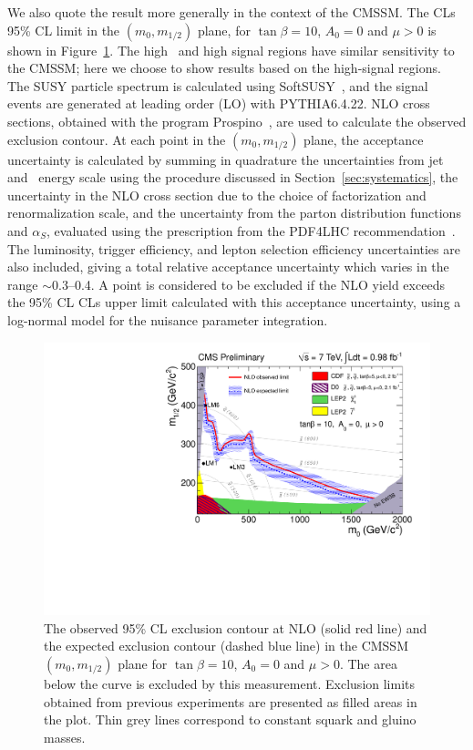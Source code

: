 We also quote the result more generally in the context of the CMSSM.
The CLs 95\% CL limit  in the  $(m_0,m_{1/2})$ plane,  for $\tan\beta=10$,
$A_0 = 0$ and $\mu > 0$ is shown in Figure~\ref{fig:msugra}. 
The high \met\ and high \Ht signal regions have similar sensitivity to the CMSSM; 
here we choose to show results based on the high-\Ht signal regions. The
SUSY particle  spectrum is calculated using  SoftSUSY~\cite{Allanach:2002uq}, and the
signal  events  are  generated  at  leading  order  (LO)  with  PYTHIA6.4.22.
NLO  cross sections,  obtained  with the
program  Prospino~\cite{Beenakker:1997kx},  are used  to  calculate  the observed
exclusion  contour.  
At each point in the  $(m_0,m_{1/2})$ plane, the acceptance uncertainty is calculated by
summing in quadrature the uncertainties from jet and \met\ energy scale using the
procedure discussed in Section~\ref{sec:systematics}, the uncertainty in the 
NLO cross section due to the choice of factorization and renormalization scale, 
and the uncertainty from the parton distribution functions and $\alpha_{S}$,
evaluated using the prescription from the PDF4LHC recommendation~\cite{PDF4LHC}.
The luminosity, trigger efficiency, and lepton selection efficiency uncertainties are also 
included, giving a total relative acceptance uncertainty which varies in the range $\sim$0.3--0.4.
A point is considered to be excluded if the NLO yield exceeds the 95\% CL
CLs upper limit calculated with this acceptance uncertainty, using
a log-normal model for the nuisance parameter integration.


\begin{figure}[tbh]
\begin{center}
\includegraphics[width=1\linewidth]{plots/RA6_ExclusionLimit_tanb10.pdf}
\caption{\label{fig:msugra}\protect 
The observed 95\% CL exclusion contour at NLO (solid red line) and the expected exclusion contour (dashed blue line) 
in the CMSSM $(m_0,m_{1/2})$ plane for  $\tan\beta=10$, $A_0 = 0$ and $\mu > 0$. 
The area below the curve is excluded by this measurement. Exclusion limits obtained from 
previous experiments are presented as filled areas in the plot. Thin grey lines correspond to 
constant squark and gluino masses.}
\end{center}
\end{figure}

